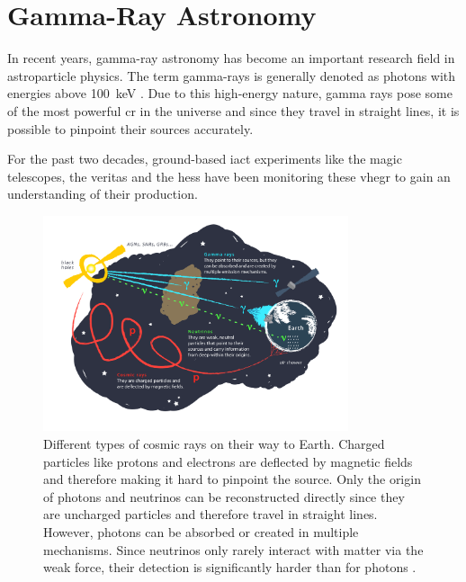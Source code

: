 \chapter{Gamma-Ray Astronomy}
\label{ch:gamma-ray-astronomy}

In recent years, gamma-ray astronomy has become an important research field in astroparticle physics.
The term gamma-rays is generally denoted as photons with energies above \SI{100}{\kilo\eV}
\cite{funk}. Due to this high-energy nature, gamma rays pose some of the most powerful \gls{cr} in
the universe and since they travel in straight lines, it is possible to pinpoint their sources accurately.

For the past two decades, ground-based \gls{iact} experiments like the \gls{magic} telescopes, the \gls{veritas} and
the \gls{hess} have been monitoring these \gls{vhegr} to gain an understanding of their production.


\begin{figure}[h]
    \centering
    \includegraphics[width=0.8\textwidth]{graphics/figure5.png}
    \caption{Different types of cosmic rays on their way to Earth. Charged particles like protons and electrons
    are deflected by magnetic fields and therefore making it hard to pinpoint the source. Only the
    origin of photons and neutrinos can be reconstructed directly since they are uncharged particles
    and therefore travel in straight lines. However, photons can be absorbed or created in multiple
    mechanisms. Since neutrinos only rarely interact with matter via the weak force, their detection
    is significantly harder than for photons \cite{fig5}.}
    \label{fig:fig5}
\end{figure}

